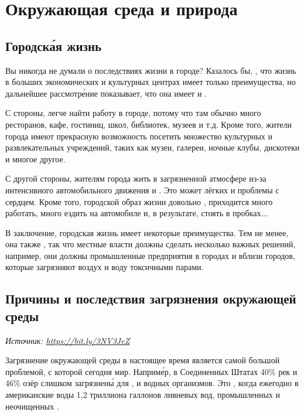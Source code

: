 \chapter{Окружающая среда и природа}

\section{Городск\'{а}я жизнь}
Вы никогда не думали о последствиях жизни в городе? Казалось бы, , что жизнь в больших экономических и культурных центрах имеет только преимущества, но дальнейшее рассмотр\'{е}ние показывает, что она имеет и .

С  стороны, легче найти работу в городе, потому что там обычно много ресторанов, кафе, гостиниц, школ, библиотек, музеев и т.д. Кроме того, жители города имеют прекрасную возможность посетить множество культурных и развлекательных учреждений, таких как музеи, галереи, ночные клубы, дискотеки и многое другое.

С другой стороны, жителям города  жить в загрязненной атмосфере из-за интенсивного автомобильного движения и  . Это может   лёгких и проблемы с сердцем. Кроме того, городской образ жизни довольно ,  приходится много работать, много ездить на автомобиле и, в результате, стоять в пробках...

В заключение, городская жизнь имеет некоторые преимущества. Тем не менее, она также , так что местные власти должны сделать несколько важных решений, например, они должны  промышленные предприятия в городах и вблизи городов, которые загрязняют воздух и воду токсичными парами.

\section[Загрязнение окружающей среды]{Причины и последствия загрязнения окружающей среды}
\textit{Источник: \url{https://bit.ly/3NV3JeZ}}

Загрязнение окружающей среды в настоящее время является самой большой проблемой, с которой сегодня  мир. Наприм\'{е}р, в Соединенных Штатах 40\% рек и 46\% озёр слишком загрязнен\'{ы} для ,  и водных организмов. Это , когда ежегодно в американские воды  1,2 триллиона галлонов  ливневых вод, промышленных  и неочищенных .

